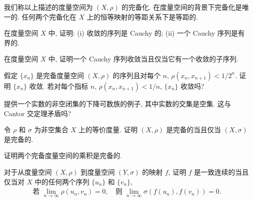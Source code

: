 \documentclass[../../main.tex]{subfiles}
\begin{document}
我们称以上描述的度量空间为 $(X,\rho)$ 的完备化. 在度量空间的背景下完备化是唯一的. 任何两个完备化在 $X$ 上的恒等映射的等距关系下是等距的.

\begin{exercise}\label{exercise:ch09-38}
在度量空间 $X$ 中, 证明: (i) 收敛的序列是 Cauchy 的; (ii) 一个 Cauchy 序列是有界的.
\end{exercise}

\begin{exercise}\label{exercise:ch09-39}
在度量空间 $X$ 中, 证明一个 Cauchy 序列收敛当且仅当它有一个收敛的子序列.
\end{exercise}

\begin{exercise}\label{exercise:ch09-40}
假定 $\{x_{n}\}$ 是完备度量空间 $(X,\rho)$ 的序列且对每个 $n$, $\rho(x_{n},x_{n+1})<1/2^{n}$. 证明 $\{x_{n}\}$ 收敛. 若对每个指标 $n$, $\rho(x_{n},x_{n+1})<1/n$, $\{x_{n}\}$ 收敛吗?
\end{exercise}

\begin{exercise}\label{exercise:ch09-41}
提供一个实数的非空闭集的下降可数族的例子, 其中实数的交集是空集. 这与 Cantor 交定理矛盾吗?
\end{exercise}

\begin{exercise}\label{exercise:ch09-42}
令 $\rho$ 和 $\sigma$ 为非空集合 $X$ 上的等价度量. 证明 $(X,\rho)$ 是完备的当且仅当 $(X,\sigma)$ 是完备的.
\end{exercise}

\begin{exercise}\label{exercise:ch09-43}
证明两个完备度量空间的乘积是完备的.
\end{exercise}

\begin{exercise}\label{exercise:ch09-44}
对于从度量空间 $(X,\rho)$ 到度量空间 $(Y,\sigma)$ 的映射 $f$, 证明 $f$ 是一致连续的当且仅当对 $X$ 中的任何两个序列 $\{u_{n}\}$ 和 $\{v_{n}\}$,
\begin{align*}
\text{若 }\lim_{n\to\infty}\rho(u_{n},v_{n})=0,\quad\text{则 }\lim_{n\to\infty}\sigma(f(u_{n}),f(v_{n}))=0.
\end{align*}
\end{exercise}
\end{document}

